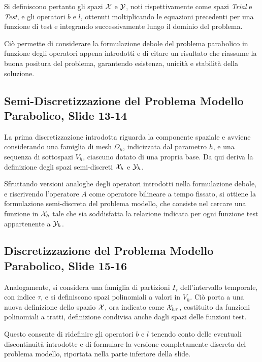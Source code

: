 \documentclass[12pt]{article}
\begin{document}
    Si definiscono pertanto gli spazi $\mathcal{X}$ e $\mathcal{Y}$, noti rispettivamente come spazi \textit{Trial} e \textit{Test}, e gli operatori $b$ e $l$, ottenuti moltiplicando le equazioni precedenti per una funzione di test e integrando successivamente lungo il dominio del problema.

    Ciò permette di considerare la formulazione debole del problema parabolico in funzione degli operatori appena introdotti e di citare un risultato che riassume la buona positura del problema, garantendo esistenza, unicità e stabilità della soluzione.

    \subsection{Semi-Discretizzazione del Problema Modello Parabolico, Slide 13-14}

    La prima discretizzazione introdotta riguarda la componente spaziale e avviene considerando una famiglia di mesh $\Omega_h$, indicizzata dal parametro $h$, e una sequenza di sottospazi $V_h$, ciascuno dotato di una propria base. Da qui deriva la definizione degli spazi semi-discreti $\mathcal{X}_h$ e $\mathcal{Y}_h$.

    Sfruttando versioni analoghe degli operatori introdotti nella formulazione debole, e riscrivendo l'operatore $A$ come operatore bilineare a tempo fissato, si ottiene la formulazione semi-discreta del problema modello, che consiste nel cercare una funzione in $\mathcal{X}_h$ tale che sia soddisfatta la relazione indicata per ogni funzione test appartenente a $\mathcal{Y}_h$.

    \subsection{Discretizzazione del Problema Modello Parabolico, Slide 15-16}

    Analogamente, si considera una famiglia di partizioni $I_{\tau}$ dell'intervallo temporale, con indice $\tau$, e si definiscono spazi polinomiali a valori in $V_h$. Ciò porta a una nuova definizione dello spazio $\mathcal{X}$, ora indicato come $\mathcal{X}_{h \tau}$, costituito da funzioni polinomiali a tratti, definizione condivisa anche dagli spazi delle funzioni test.

    Questo consente di ridefinire gli operatori $b$ e $l$ tenendo conto delle eventuali discontinuità introdotte e di formulare la versione completamente discreta del problema modello, riportata nella parte inferiore della slide.
\end{document}
